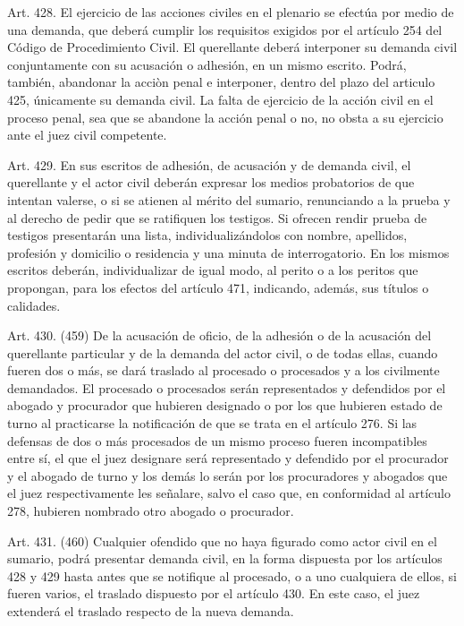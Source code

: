     Art. 428. El ejercicio de las acciones civiles en el plenario se efectúa por medio de una demanda, que deberá cumplir los requisitos exigidos por el artículo 254 del Código de Procedimiento Civil.
    El querellante deberá interponer su demanda civil conjuntamente con su acusación o adhesión, en un mismo escrito. Podrá, también, abandonar la acciòn penal e interponer, dentro del plazo del articulo 425, únicamente su demanda civil.
    La falta de ejercicio de la acción civil en el proceso penal, sea que se abandone la acción penal o no, no obsta a su ejercicio ante el juez civil competente.

    Art. 429. En sus escritos de adhesión, de acusación y de demanda civil, el querellante y el actor civil deberán expresar los medios probatorios de que intentan valerse, o si se atienen al mérito del sumario, renunciando a la prueba y al derecho de pedir que se ratifiquen los testigos. Si ofrecen rendir prueba de testigos presentarán una lista, individualizándolos con nombre, apellidos, profesión y domicilio o residencia y una minuta de interrogatorio.
    En los mismos escritos deberán, individualizar de igual modo, al perito o a los peritos que propongan, para los efectos del artículo 471, indicando, además, sus títulos o calidades.

    Art. 430. (459) De la acusación de oficio, de la adhesión o de la acusación del querellante particular y de la demanda del actor civil, o de todas ellas, cuando fueren dos o más, se dará traslado al procesado o procesados y a los civilmente demandados.
    El procesado o procesados serán representados y defendidos por el abogado y procurador que hubieren designado o por los que hubieren estado de turno al practicarse la notificación de que se trata en el artículo 276.
    Si las defensas de dos o más procesados de un mismo proceso fueren incompatibles entre sí, el que el juez designare será representado y defendido por el procurador y el abogado de turno y los demás lo serán por los procuradores y abogados que el juez respectivamente les señalare, salvo el caso que, en conformidad al artículo 278, hubieren nombrado otro abogado o procurador.



    Art. 431. (460) Cualquier ofendido que no haya figurado como actor civil en el sumario, podrá presentar demanda civil, en la forma dispuesta por los artículos 428 y 429 hasta antes que se notifique al procesado, o a uno cualquiera de ellos, si fueren varios, el traslado dispuesto por el artículo 430. En este caso, el juez extenderá el traslado respecto de la nueva demanda.


